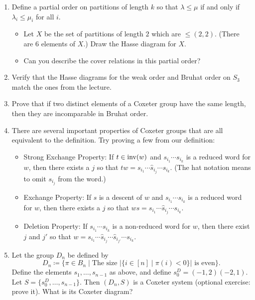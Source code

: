 \documentclass{article}
\numberwithin{equation}{section}
\theoremstyle{remark}
\theoremstyle{definition}
\begin{document}
\begin{enumerate}
		
		\item Define a partial order on partitions of length $k$ so that $\lambda \leq \mu$ if and only if $\lambda_i\leq \mu_i$ for all $i$. 
		\begin{itemize}
		\item[(a)] Let $X$ be the set of partitions of length $2$ which are $\leq (2,2)$. (There are $6$ elements of $X$.) Draw the Hasse diagram for $X$.
		\item[(b)] Can you describe the cover relations in this partial order?
		\end{itemize}
		
		
		\item Verify that the Hasse diagrams for the weak order and Bruhat order on $S_3$ match the ones from the lecture.
		
		\item Prove that if two distinct elements of a Coxeter group have the same length, then they are incomparable in Bruhat order.
		
		
		\item There are several important properties of Coxeter groups that are all equivalent to the definition. Try proving a few from our definition:
		\begin{itemize}
			\item[(a)] Strong Exchange Property: If $t\in \operatorname{inv}(w)$ and $s_{i_1}\cdots s_{i_k}$ is a reduced word for $w$, then there exists a $j$ so that  $tw = s_{i_1}\cdots \widehat s_{i_j}  \cdots s_{i_k}$. (The hat notation means to omit $s_{i_j}$ from the word.)
			
			\item[(b)] Exchange Property: If $s$ is a descent of $w$ and $s_{i_1}\cdots s_{i_k}$ is a reduced word for $w$, then there exists a $j$ so that  $ws = s_{i_1}\cdots \widehat s_{i_j}  \cdots s_{i_k}$.
			
			\item[(c)] Deletion Property: If $s_{i_1}\cdots s_{i_k}$ is a non-reduced word for $w$, then there exist $j$ and $j'$ so that $w = s_{i_1}\cdots \widehat s_{i_j} \cdots \widehat s_{i_{j'}} \cdots s_{i_k}$.
		\end{itemize}
		
		
		\item Let the group $D_n$ be defined by 
		\[ D_n \coloneqq \{ \pi \in B_n \mid  \text{The size } |\{i\in [n] \mid \pi(i)<0\}| \text{ is even}  \}. \]
		Define the elements $s_1,\ldots, s_{n-1}$ as above, and define $s_0^D = (-1,2)(-2,1)$. Let $S=\{s_0^D,\ldots,s_{n-1}\}$. Then $(D_n,S)$ is a Coxeter system (optional exercise: prove it). What is its Coxeter diagram? 
		

\end{enumerate}
\end{document}
